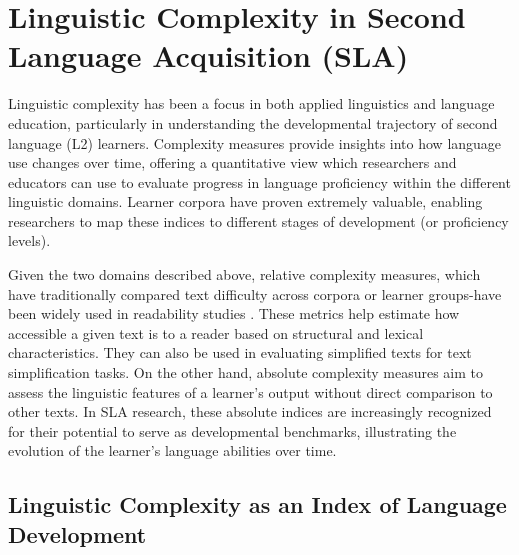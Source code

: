 \section{Linguistic Complexity in Second Language Acquisition (SLA)}


Linguistic complexity has been a focus in both applied linguistics and language education, particularly in
understanding the developmental trajectory of second language (L2) learners. Complexity measures provide insights
into how language use changes over time, offering a quantitative view which researchers and educators can use to
evaluate progress in language proficiency within the different linguistic domains. Learner corpora have proven
extremely valuable, enabling researchers to map these indices to different stages of development (or proficiency
levels).

Given the two domains described above, relative complexity measures, which have traditionally compared text difficulty
across corpora or learner groups-have been widely used in readability studies
\citep{shain2016, Feng2009, dellorletta2011, francois2012-ai, Berendes2018} . These metrics help estimate how
accessible a
given
text is to a
reader
based on structural and lexical characteristics. They can also be used in evaluating simplified texts for
text simplification tasks. On the other hand, absolute complexity measures aim to assess the linguistic features
of a learner's output without direct comparison to other texts. In SLA research, these absolute indices are
increasingly recognized for their potential to serve as developmental benchmarks, illustrating the evolution of the
learner's language abilities over time.

\subsection{Linguistic Complexity as an Index of Language Development}

